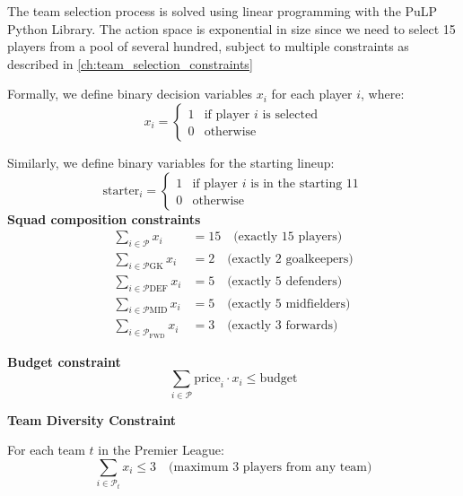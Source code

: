The team selection process is solved using linear programming with the PuLP Python Library. The action space is exponential in size since we need to select 15 players from a pool of several hundred, subject to multiple constraints as described in \ref{ch:team_selection_constraints}

Formally, we define binary decision variables $x_i$ for each player $i$, where:
\begin{equation}
    x_i =
    \begin{cases}
        1 & \text{if player $i$ is selected} \\
        0 & \text{otherwise}
    \end{cases}
\end{equation}

Similarly, we define binary variables for the starting lineup:
\begin{equation}
    \text{starter}_i =
    \begin{cases}
        1 & \text{if player $i$ is in the starting 11} \\
        0 & \text{otherwise}
    \end{cases}
\end{equation}
\break
\textbf{Squad composition constraints}
\begin{align}
    \sum_{i \in \mathcal{P}} x_i &= 15 \quad \text{(exactly 15 players)} \\
    \sum_{i \in \mathcal{P}{\text{GK}}} x_i &= 2 \quad \text{(exactly 2 goalkeepers)} \\
    \sum_{i \in \mathcal{P}{\text{DEF}}} x_i &= 5 \quad \text{(exactly 5 defenders)} \\
    \sum_{i \in \mathcal{P}{\text{MID}}} x_i &= 5 \quad \text{(exactly 5 midfielders)} \\
    \sum_{i \in \mathcal{P}_{\text{FWD}}} x_i &= 3 \quad \text{(exactly 3 forwards)}
\end{align}

\textbf{Budget constraint}
\begin{equation}
    \sum_{i \in \mathcal{P}} \text{price}_i \cdot x_i \leq \text{budget}
\end{equation}

\textbf{Team Diversity Constraint}

For each team $t$ in the Premier League:
\begin{equation}
\sum_{i \in \mathcal{P}_t} x_i \leq 3 \quad \text{(maximum 3 players from any team)}
\end{equation}

